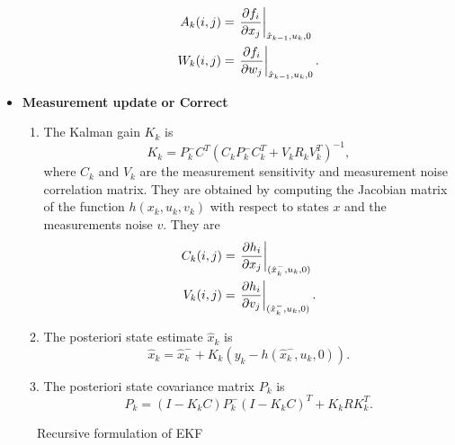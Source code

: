 \begin{itemize}
\begin{enumerate}
\begin{equation}
\begin{split}
	A_k(i,j) &= \left. \frac{\partial {f_i}}{\partial {x_j}}\right \vert_{\hat{x}_{k-1},u_k,0}  \\
	W_k(i,j) &= \left. \frac{\partial {f_i}}{\partial {w_j}}\right \vert_{\hat{x}_{k-1},u_k,0}.
	\end{split}
\end{equation}
\end{enumerate}
\item \textbf{Measurement update or Correct} 
\begin{enumerate}
	\item The Kalman gain $K_k$ is 
		$$K_k = P_k^-C^T(C_kP_k^-C_k^T + V_kR_kV_k^T)^{-1},$$
		where $C_k$ and $V_k$ are the measurement sensitivity and measurement noise correlation matrix. They are obtained by computing the Jacobian matrix of the function $h(x_k,u_k,v_k)$ with respect to states $x$ and the measurements noise $v$. They are 
		\begin{equation}
		\begin{split}
		C_k(i,j) &= \left. \frac{\partial {h_i}}{\partial {x_j}}\right \vert_{(\hat{x}_k^-,u_k,0)} \\
		V_k(i,j) &= \left. \frac{\partial {h_i}}{\partial {v_j}}\right \vert_{(\hat{x}_k^-,u_k,0)}.
		\end{split}
		\end{equation}
	\item The posteriori state estimate $\hat x_k$ is
		$$\hat{x}_k = \hat{x}_k^- + K_k(y_k-h(\hat{x}_k^-,u_k,0)).$$
	\item The posteriori state covariance matrix $P_k$ is
			$${P}_{k} = (I - {K}_k {C}) {P}_{k}^{-} (I - {K}_k {C})^{T} + {K}_k {R} {K}_k^{T}.$$
\end{enumerate}
\end{itemize}
\begin{figure}  

\caption{Recursive formulation of EKF}
\label{fig:ekf_blk}
\end{figure}


